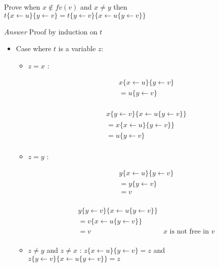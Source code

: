   \exo \label{exo:commsubst} Prove when $x\not\in fv(v)$ and $x \not = y$ then
  $t\{x\leftarrow u\}\{y\leftarrow v\} = t\{y\leftarrow v\}\{x\leftarrow u\{y\leftarrow v\}\}$

  \textit{Answer} Proof by induction on $t$
  \begin{itemize}
    \item Case where $t$ is a variable $z$:
      \begin{itemize}
        \item $z = x$ :
          \begin{multicols}{2}
            \begin{align*}
              &x\{x\leftarrow u\}\{y\leftarrow v\} \\
              &= u\{y\leftarrow v\} \\
            \end{align*}

            \begin{align*}
              &x\{y\leftarrow v\}\{x\leftarrow u\{y\leftarrow v\}\} \\
              &= x\{x\leftarrow u\}\{y\leftarrow v\}\} \\
              &= u\{y\leftarrow v\} \\
            \end{align*}
          \end{multicols}

        \item $z = y$ :
          \begin{multicols}{2}
            \begin{align*}
              &y\{x\leftarrow u\}\{y\leftarrow v\} \\
              &= y\{y\leftarrow v\} \\
              &= v \\
            \end{align*}

            \begin{align*}
              &y\{y\leftarrow v\}\{x\leftarrow u\{y\leftarrow v\}\} \\
              &= v\{x\leftarrow u\{y\leftarrow v\}\} \\
              &= v & \text{$x$ is not free in $v$} \\
            \end{align*}
          \end{multicols}
        \item $z \not = y$ and $z \not = x$ :
          $z\{x\leftarrow u\}\{y\leftarrow v\} = z$ and
          $z\{y\leftarrow v\}\{x\leftarrow u\{y\leftarrow v\}\} = z$
      \end{itemize}


\end{itemize}
